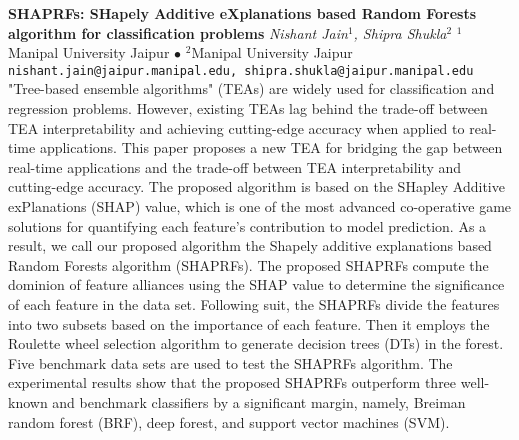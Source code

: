
    \begin{conf-abstract}[]
        {\textbf{SHAPRFs: SHapely Additive eXplanations based Random Forests algorithm for classification problems}}
        {\textit{Nishant Jain$^{1}$, Shipra Shukla$^{2}$}}
        {$^{1}$Manipal University Jaipur $\bullet$ $^{2}$Manipal University Jaipur}
        {\texttt{nishant.jain@jaipur.manipal.edu, shipra.shukla@jaipur.manipal.edu}}
        {"Tree-based ensemble algorithms" (TEAs) are widely used for classification and regression problems. However, existing TEAs lag behind the trade-off between TEA interpretability and achieving cutting-edge accuracy when applied to real-time applications. This paper proposes a new TEA for bridging the gap between real-time applications and the trade-off between TEA interpretability and cutting-edge accuracy. The proposed algorithm is based on the SHapley Additive exPlanations (SHAP) value, which is one of the most advanced co-operative game solutions for quantifying each feature's contribution to model prediction. As a result, we call our proposed algorithm the Shapely additive explanations based Random Forests algorithm (SHAPRFs). The proposed SHAPRFs compute the dominion of feature alliances using the SHAP value to determine the significance of each feature in the data set. Following suit, the SHAPRFs divide the features into two subsets based on the importance of each feature. Then it employs the Roulette wheel selection algorithm to generate decision trees (DTs) in the forest. Five benchmark data sets are used to test the SHAPRFs algorithm. The experimental results show that the proposed SHAPRFs outperform three well-known and benchmark classifiers by a significant margin, namely, Breiman random forest (BRF), deep forest, and support vector machines (SVM).}
    \end{conf-abstract}
        